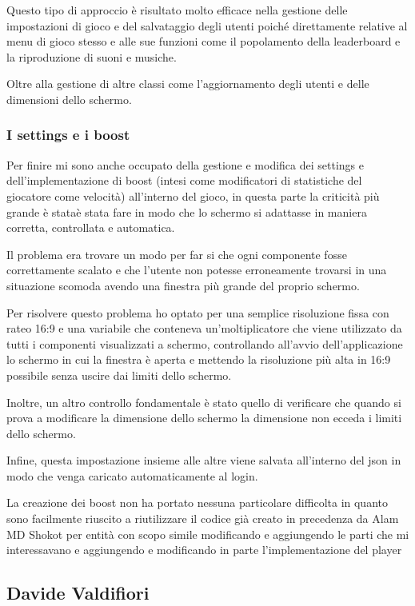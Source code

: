 \documentclass[a4paper,12pt]{report}
\begin{document}
    Questo tipo di approccio è risultato molto efficace nella gestione delle impostazioni di gioco e del salvataggio degli utenti poiché direttamente relative al menu di gioco stesso e alle sue funzioni come il popolamento della leaderboard e la riproduzione di suoni e musiche.

    Oltre alla gestione di altre classi come l’aggiornamento degli utenti e delle dimensioni dello schermo.

    \subsubsection{I settings e i boost}

    Per finire mi sono anche occupato della gestione e modifica dei settings e dell’implementazione di boost (intesi come modificatori di statistiche del giocatore come velocità) all’interno del gioco, in questa parte la criticità più grande è  stataè stata fare in modo che lo schermo si adattasse in maniera corretta, controllata e automatica.

    Il problema era trovare un modo per far si che ogni componente fosse correttamente scalato e che l’utente non potesse erroneamente trovarsi in una situazione scomoda avendo una finestra più grande del proprio schermo.

    Per risolvere questo problema ho optato per una semplice risoluzione fissa con rateo 16:9 e una variabile che conteneva un’moltiplicatore che viene utilizzato da tutti i componenti visualizzati a schermo, controllando all’avvio dell’applicazione lo schermo in cui la finestra è aperta e mettendo la risoluzione più alta in 16:9 possibile senza uscire dai limiti dello schermo.

    Inoltre, un altro controllo fondamentale è stato quello di verificare che quando si prova a modificare la dimensione dello schermo la dimensione non ecceda i limiti dello schermo.

    Infine, questa impostazione insieme alle altre viene salvata all’interno del json in modo che venga caricato automaticamente al login.

    La creazione dei boost non ha portato nessuna particolare difficolta in quanto sono facilmente riuscito a riutilizzare il codice già creato in precedenza da Alam MD Shokot per entità con scopo simile modificando e aggiungendo le parti che mi interessavano e aggiungendo e modificando in parte l’implementazione del player

    \subsection*{Davide Valdifiori}
\end{document}
